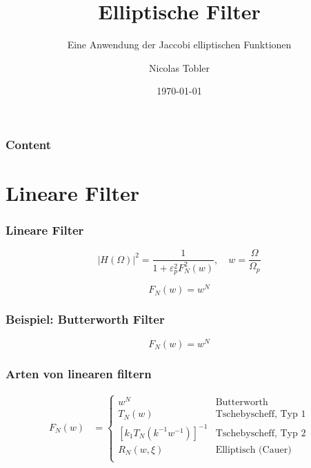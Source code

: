 \documentclass[ngerman, aspectratio=169, xcolor={rgb}]{beamer}
\title{Elliptische Filter}
\subtitle{Eine Anwendung der Jaccobi elliptischen Funktionen}
\author{Nicolas Tobler}
\date{\today}
\begin{document}
	\begin{frame}
		\titlepage
	\end{frame}

	\begin{frame}
		\frametitle{Content}
		\tableofcontents
	\end{frame}

	\section{Lineare Filter}

	\begin{frame}
		\frametitle{Lineare Filter}


		\begin{equation}
			| H(\Omega)|^2 = \frac{1}{1 + \varepsilon_p^2 F_N^2(w)}, \quad w=\frac{\Omega}{\Omega_p}
		\end{equation}

		\pause

		\begin{equation}
			F_N(w) = w^N
		\end{equation}

	\end{frame}

	\begin{frame}
		\frametitle{Beispiel: Butterworth Filter}

		\begin{equation}
			F_N(w) = w^N
		\end{equation}

		\begin{center}
			
		\end{center}

	\end{frame}


	\begin{frame}
		\frametitle{Arten von linearen filtern}

		\begin{align*}
			F_N(w) & =
			\begin{cases}
				w^N                            & \text{Butterworth} \\
				T_N(w)                         & \text{Tschebyscheff, Typ 1}  \\
				[k_1 T_N (k^{-1} w^{-1})]^{-1} & \text{Tschebyscheff, Typ 2}  \\
				R_N(w,\xi)                      & \text{Elliptisch (Cauer)}    \\
			\end{cases}
		\end{align*}

	\end{frame}
\end{document}
